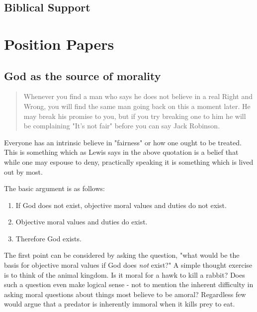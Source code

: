 \documentclass[12pt]{turabian-researchpaper}
\begin{document}
\subsection{Biblical Support}



\section{Position Papers}
\subsection{God as the source of morality}


\begin{quotation}
\noindent Whenever you find a man who says he does not believe in a real Right and Wrong, you will find the same man going back on this a moment later. He may break his promise to you, but if you try breaking one to him he will be complaining "It's not fair" before you can say Jack Robinson.\autocite[pg.6]{lewis2001mere}
\end{quotation}

\noindent Everyone has an intrinsic believe in "fairness" or how one ought to be treated. This is something which as Lewis says in the above quotation is a belief that while one may espouse to deny, practically speaking it is something which is lived out by most.

The basic argument is as follows\autocite[pg.172]{craig2008reasonable}:

\begin{enumerate}
\item If God does not exist, objective moral values and duties do not exist.
\item Objective moral values and duties do exist.
\item Therefore God exists.
\end{enumerate}

The first point can be considered by asking the question, "what would be the basis for objective moral values if God does \textit{not} exist?" A simple thought exercise is to think of the animal kingdom. Is it moral for a hawk to kill a rabbit? Does such a question even make logical sense - not to mention the inherent difficulty in asking moral questions about things most believe to be amoral? Regardless few would argue that a predator is inherently immoral when it kills prey to eat.
\end{document}
